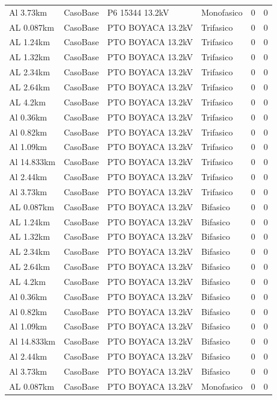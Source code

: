 \documentclass[11pt,a4paper]{article}
\begin{document}
\begin{longtable}{llllrr}
Al 3.73km & CasoBase & P6 15344 13.2kV & Monofasico & 0 & 0 \\
AL 0.087km & CasoBase & PTO BOYACA 13.2kV & Trifasico & 0 & 0 \\
AL 1.24km & CasoBase & PTO BOYACA 13.2kV & Trifasico & 0 & 0 \\
AL 1.32km & CasoBase & PTO BOYACA 13.2kV & Trifasico & 0 & 0 \\
AL 2.34km & CasoBase & PTO BOYACA 13.2kV & Trifasico & 0 & 0 \\
AL 2.64km & CasoBase & PTO BOYACA 13.2kV & Trifasico & 0 & 0 \\
AL 4.2km & CasoBase & PTO BOYACA 13.2kV & Trifasico & 0 & 0 \\
Al 0.36km & CasoBase & PTO BOYACA 13.2kV & Trifasico & 0 & 0 \\
Al 0.82km & CasoBase & PTO BOYACA 13.2kV & Trifasico & 0 & 0 \\
Al 1.09km & CasoBase & PTO BOYACA 13.2kV & Trifasico & 0 & 0 \\
Al 14.833km & CasoBase & PTO BOYACA 13.2kV & Trifasico & 0 & 0 \\
Al 2.44km & CasoBase & PTO BOYACA 13.2kV & Trifasico & 0 & 0 \\
Al 3.73km & CasoBase & PTO BOYACA 13.2kV & Trifasico & 0 & 0 \\
AL 0.087km & CasoBase & PTO BOYACA 13.2kV & Bifasico & 0 & 0 \\
AL 1.24km & CasoBase & PTO BOYACA 13.2kV & Bifasico & 0 & 0 \\
AL 1.32km & CasoBase & PTO BOYACA 13.2kV & Bifasico & 0 & 0 \\
AL 2.34km & CasoBase & PTO BOYACA 13.2kV & Bifasico & 0 & 0 \\
AL 2.64km & CasoBase & PTO BOYACA 13.2kV & Bifasico & 0 & 0 \\
AL 4.2km & CasoBase & PTO BOYACA 13.2kV & Bifasico & 0 & 0 \\
Al 0.36km & CasoBase & PTO BOYACA 13.2kV & Bifasico & 0 & 0 \\
Al 0.82km & CasoBase & PTO BOYACA 13.2kV & Bifasico & 0 & 0 \\
Al 1.09km & CasoBase & PTO BOYACA 13.2kV & Bifasico & 0 & 0 \\
Al 14.833km & CasoBase & PTO BOYACA 13.2kV & Bifasico & 0 & 0 \\
Al 2.44km & CasoBase & PTO BOYACA 13.2kV & Bifasico & 0 & 0 \\
Al 3.73km & CasoBase & PTO BOYACA 13.2kV & Bifasico & 0 & 0 \\
AL 0.087km & CasoBase & PTO BOYACA 13.2kV & Monofasico & 0 & 0 \\

\end{longtable}
\end{document}
